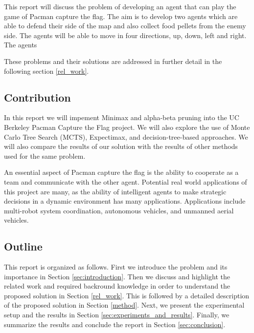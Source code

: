 \documentclass[a4paper,12pt]{article}
\begin{document}
This report will discuss the problem of developing an agent that can play the game of Pacman capture the flag. The aim is to develop two agents which are able to defend their side of the map and also collect food pellets from the enemy side. The agents will be able to move in four directions, up, down, left and right. The agents 




These problems and their solutions are addressed in further detail in the following section \ref{rel_work}.




\subsection{Contribution}

In this report we will impement Minimax and alpha-beta pruning into the UC Berkeley Pacman Capture the Flag project. We will also explore the use of Monte Carlo Tree Search (MCTS), Expectimax, and decision-tree-based approaches.
We will also compare the results of our solution with the results of other methods used for the same problem.

An essential aspect of Pacman capture the flag is the ability to cooperate as a team and communicate with the other agent. 
Potential real world applications of this project are many, as the ability of intelligent agents to make strategic decisions in a dynamic environment has many applications. 
Applications include multi-robot system coordination, autonomous vehicles, and unmanned aerial vehicles.







\subsection{Outline}
This report is organized as follows. First we introduce the problem and its importance in Section \ref{sec:introduction}. Then we discuss and highlight the related work and required backround knowledge in order to understand the proposed solution in Section \ref{rel_work}. This is followed by a detailed description of the proposed solution in Section \ref{method}. Next, we present the experimental setup and the results in Section \ref{sec:experiments_and_results}.
Finally, we summarize the results and conclude the report in Section \ref{sec:conclusion}.
\end{document}
